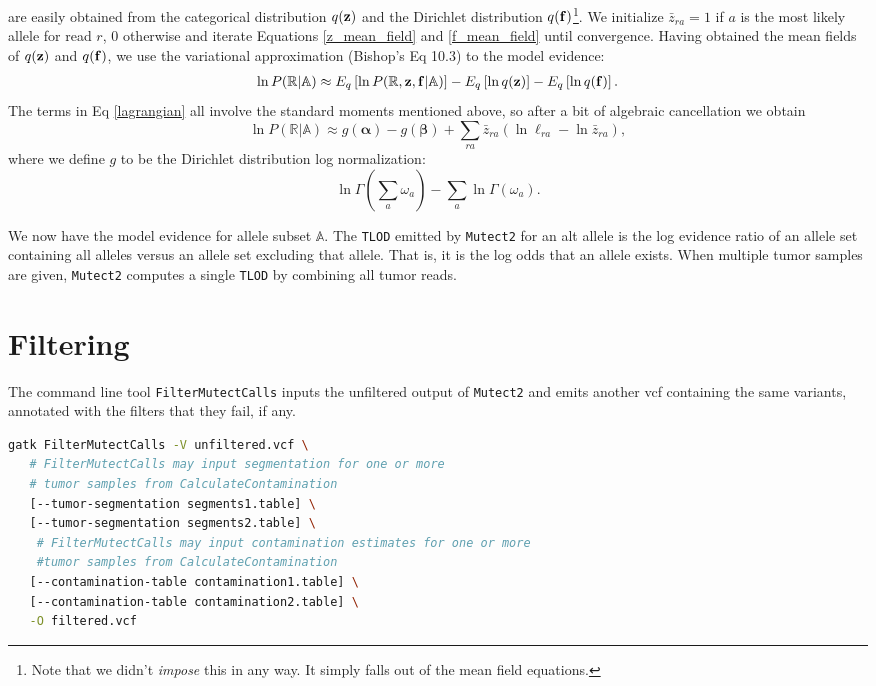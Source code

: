 \documentclass[nofootinbib,amssymb,amsmath]{revtex4}
\newcommand{\vf}{{\bf f}}
\newcommand{\vz}{{\bf z}}
\newcommand{\valpha}{{\bm{\alpha}}}
\newcommand{\vbeta}{{\bm{\beta}}}
\newcommand{\code}[1]{\texttt{#1}}
\begin{document}
are easily obtained from the categorical distribution $q(\vz)$ and the Dirichlet distribution $q(\vf)$\footnote{Note that we didn't \textit{impose} this in any way.  It simply falls out of the mean field equations.}.  We initialize $\bar{z}_{ra} = 1$ if $a$ is the most likely allele for read $r$, 0 otherwise and iterate Equations \ref{z_mean_field} and \ref{f_mean_field} until convergence. Having obtained the mean fields of $q(\vz)$ and $q(\vf)$, we use the variational approximation (Bishop's Eq 10.3) to the model evidence:
\begin{align}
\ln P(\mathbb{R} | \mathbb{A}) \approx  E_q \left[ \ln P(\mathbb{R}, \vz, \vf | \mathbb{A}) \right] - E_q \left[ \ln q(\vz) \right] - E_q \left[ \ln q(\vf) \right]. \label{lagrangian}
\end{align}
The terms in Eq \ref{lagrangian} all involve the standard moments mentioned above, so after a bit of algebraic cancellation we obtain
\begin{equation}
\ln P(\mathbb{R} | \mathbb{A}) \approx g(\valpha) - g(\vbeta) +  \sum_{ra} \bar{z}_{ra} \left( \ln \ell_{ra} - \ln \bar{z}_{ra} \right),
\label{tumor-lod}
\end{equation}
where we define $g$ to be the Dirichlet distribution log normalization:
\begin{equation}
\ln \Gamma(\sum_a \omega_a) - \sum_a \ln \Gamma(\omega_a).
\end{equation}

We now have the model evidence for allele subset $\mathbb{A}$. The \code{TLOD} emitted by \code{Mutect2} for an alt allele is the log evidence ratio of an allele set containing all alleles versus an allele set excluding that allele.  That is, it is the log odds that an allele exists.  When multiple tumor samples are given, \code{Mutect2} computes a single \code{TLOD} by combining all tumor reads.

\section{Filtering}
The command line tool \code{FilterMutectCalls} inputs the unfiltered output of \code{Mutect2} and emits another vcf containing the same variants, annotated with the filters that they fail, if any.

\begin{lstlisting}[language=bash,caption={FilterMutectCalls command}, label={cmd-mutect2}]
gatk FilterMutectCalls -V unfiltered.vcf \
   # FilterMutectCalls may input segmentation for one or more 
   # tumor samples from CalculateContamination
   [--tumor-segmentation segments1.table] \
   [--tumor-segmentation segments2.table] \
    # FilterMutectCalls may input contamination estimates for one or more 
    #tumor samples from CalculateContamination
   [--contamination-table contamination1.table] \
   [--contamination-table contamination2.table] \
   -O filtered.vcf
\end{lstlisting}
\end{document}

